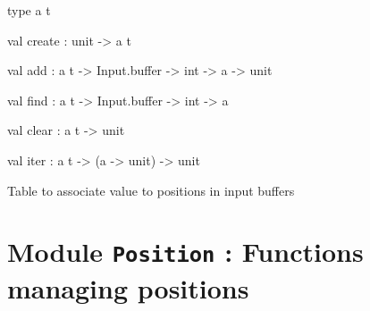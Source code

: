 \documentclass[11pt]{article}
\begin{document}
\begin{ocamldocsigend}


\label{type:Input.Tbl.t}\begin{ocamldoccode}
type {\textquotesingle}a t 
\end{ocamldoccode}


\label{val:Input.Tbl.create}\begin{ocamldoccode}
val create : unit -> {\textquotesingle}a t
\end{ocamldoccode}


\label{val:Input.Tbl.add}\begin{ocamldoccode}
val add : {\textquotesingle}a t -> Input.buffer -> int -> {\textquotesingle}a -> unit
\end{ocamldoccode}


\label{val:Input.Tbl.find}\begin{ocamldoccode}
val find : {\textquotesingle}a t -> Input.buffer -> int -> {\textquotesingle}a
\end{ocamldoccode}


\label{val:Input.Tbl.clear}\begin{ocamldoccode}
val clear : {\textquotesingle}a t -> unit
\end{ocamldoccode}


\label{val:Input.Tbl.iter}\begin{ocamldoccode}
val iter : {\textquotesingle}a t -> ({\textquotesingle}a -> unit) -> unit
\end{ocamldoccode}
\end{ocamldocsigend}


\begin{ocamldocdescription}
Table to associate value to positions in input buffers


\end{ocamldocdescription}


\section{Module {\tt{Position}} : Functions managing positions}
\label{module:Position}




\ocamldocvspace{0.5cm}
\end{document}
